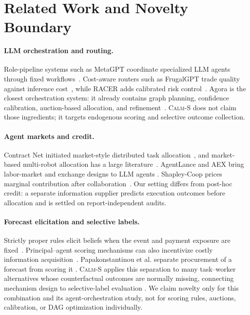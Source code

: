 \documentclass[sigconf,anonymous,review]{acmart}
\newcommand{\calms}{\textsc{Calm-S}}
\begin{document}
\section{Related Work and Novelty Boundary}

\paragraph{LLM orchestration and routing.}
Role-pipeline systems such as MetaGPT coordinate specialized LLM agents through
fixed workflows~\cite{hong2024metagpt}. Cost-aware routers such as FrugalGPT trade
quality against inference cost~\cite{chen2024frugalgpt}, while RACER adds
calibrated risk control~\cite{hao2026racer}. Agora is the closest orchestration
system: it already contains graph planning, confidence calibration, auction-based
allocation, and refinement~\cite{zhou2026agora}. \calms{} does not claim those
ingredients; it targets endogenous scoring and selective outcome collection.

\paragraph{Agent markets and credit.}
Contract Net initiated market-style distributed task allocation~\cite{smith1980contract},
and market-based multi-robot allocation has a large literature~\cite{dias2006market}.
AgentLance and AEX bring labor-market and exchange designs to LLM agents
\cite{liu2026agentlance,yang2025aex}. Shapley-Coop prices marginal contribution
after collaboration~\cite{hua2025shapley}. Our setting differs from post-hoc
credit: a separate information supplier predicts execution outcomes before
allocation and is settled on report-independent audits.

\paragraph{Forecast elicitation and selective labels.}
Strictly proper rules elicit beliefs when the event and payment exposure are
fixed~\cite{gneiting2007proper}. Principal--agent scoring mechanisms can also
incentivize costly information acquisition~\cite{chen2023principal}.
Papakonstantinou et al. separate procurement of a forecast from scoring it
\cite{papakonstantinou2008truthful}. \calms{} applies this separation to many
task--worker alternatives whose counterfactual outcomes are normally missing,
connecting mechanism design to selective-label evaluation
\cite{lakkaraju2017selective}. We claim novelty only for this combination and its
agent-orchestration study, not for scoring rules, auctions, calibration, or DAG
optimization individually.
\end{document}
